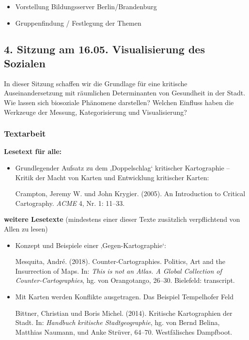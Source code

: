 \documentclass[
  ngerman,
]{article}
\providecommand{\tightlist}{%
  \setlength{\itemsep}{0pt}\setlength{\parskip}{0pt}}
\begin{document}
\begin{itemize}
\tightlist
\item
  Vorstellung Bildungsserver Berlin/Brandenburg
\item
  Gruppenfindung / Festlegung der Themen
\end{itemize}

\hypertarget{sitzung-am-16.05.-visualisierung-des-sozialen}{%
\subsection*{4. Sitzung am 16.05. \textbar{} Visualisierung des Sozialen}\label{sitzung-am-16.05.-visualisierung-des-sozialen}}

In dieser Sitzung schaffen wir die Grundlage für eine kritische Auseinandersetzung mit räumlichen Determinanten von Gesundheit in der Stadt. Wie lassen sich biosoziale Phänomene darstellen? Welchen Einfluss haben die Werkzeuge der Messung, Kategorisierung und Visualisierung?

\hypertarget{textarbeit-3}{%
\subsubsection*{Textarbeit}\label{textarbeit-3}}

\textbf{Lesetext für alle:}

\begin{itemize}
\item
  Grundlegender Aufsatz zu dem ‚Doppelschlag` kritischer Kartographie -- Kritik der Macht von Karten und Entwicklung kritischer Karten:

  Crampton, Jeremy W. und John Krygier. (2005). An Introduction to Critical Cartography. \emph{ACME} 4, Nr. 1: 11--33.
\end{itemize}

\textbf{weitere Lesetexte}
(mindestens einer dieser Texte zusätzlich verpflichtend von Allen zu lesen)

\begin{itemize}
\item
  Konzept und Beispiele einer ‚Gegen-Kartographie`:

  Mesquita, André. (2018). Counter-Cartographies. Politics, Art and the Insurrection of Maps. In: \emph{This is not an Atlas. A Global Collection of Counter-Cartographies}, hg. von Orangotango, 26--30. Bielefeld: transcript.
\item
  Mit Karten werden Konflikte ausgetragen. Das Beispiel Tempelhofer Feld

  Bittner, Christian und Boris Michel. (2014). Kritische Kartographien der Stadt. In: \emph{Handbuch kritische Stadtgeographie}, hg. von Bernd Belina, Matthias Naumann, und Anke Strüver, 64--70. Westfälisches Dampfboot.
\end{itemize}
\end{document}
